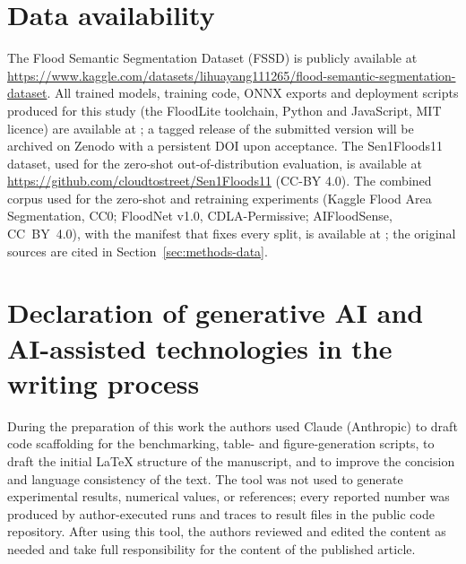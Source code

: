 \section*{Data availability}
The Flood Semantic Segmentation Dataset (FSSD) is publicly available at \url{https://www.kaggle.com/datasets/lihuayang111265/flood-semantic-segmentation-dataset}. All trained models, training code, ONNX exports and deployment scripts produced for this study (the FloodLite toolchain, Python and JavaScript, MIT licence) are available at \repoURL; a tagged release of the submitted version will be archived on Zenodo with a persistent DOI upon acceptance. The Sen1Floods11 dataset, used for the zero-shot out-of-distribution evaluation, is available at \url{https://github.com/cloudtostreet/Sen1Floods11} (CC-BY 4.0). The combined corpus used for the zero-shot and retraining experiments (Kaggle Flood Area Segmentation, CC0; FloodNet v1.0, CDLA-Permissive; AIFloodSense, CC~BY~4.0), with the manifest that fixes every split, is available at \combinedURL; the original sources are cited in Section~\ref{sec:methods-data}.

\section*{Declaration of generative AI and AI-assisted technologies in the writing process}
During the preparation of this work the authors used Claude (Anthropic) to draft code scaffolding for the benchmarking, table- and figure-generation scripts, to draft the initial LaTeX structure of the manuscript, and to improve the concision and language consistency of the text. The tool was not used to generate experimental results, numerical values, or references; every reported number was produced by author-executed runs and traces to result files in the public code repository. After using this tool, the authors reviewed and edited the content as needed and take full responsibility for the content of the published article.
